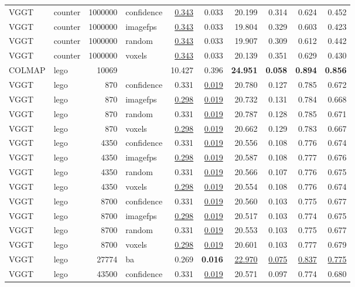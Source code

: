 \begin{table}[H]
\begin{tabular}{llrlrrrrrr}
VGGT & counter & 1000000 & confidence & \underline{0.343} & 0.033 & 20.199 & 0.314 & 0.624 & 0.452 \\
VGGT & counter & 1000000 & imagefps & \underline{0.343} & 0.033 & 19.804 & 0.329 & 0.603 & 0.423 \\
VGGT & counter & 1000000 & random & \underline{0.343} & 0.033 & 19.907 & 0.309 & 0.612 & 0.442 \\
VGGT & counter & 1000000 & voxels & \underline{0.343} & 0.033 & 20.139 & 0.351 & 0.629 & 0.430 \\
\midrule
COLMAP & lego & 10069 &  & 10.427 & 0.396 & \textbf{24.951} & \textbf{0.058} & \textbf{0.894} & \textbf{0.856} \\
VGGT & lego & 870 & confidence & 0.331 & \underline{0.019} & 20.780 & 0.127 & 0.785 & 0.672 \\
VGGT & lego & 870 & imagefps & \underline{0.298} & \underline{0.019} & 20.732 & 0.131 & 0.784 & 0.668 \\
VGGT & lego & 870 & random & 0.331 & \underline{0.019} & 20.787 & 0.128 & 0.785 & 0.671 \\
VGGT & lego & 870 & voxels & \underline{0.298} & \underline{0.019} & 20.662 & 0.129 & 0.783 & 0.667 \\
VGGT & lego & 4350 & confidence & 0.331 & \underline{0.019} & 20.556 & 0.108 & 0.776 & 0.674 \\
VGGT & lego & 4350 & imagefps & \underline{0.298} & \underline{0.019} & 20.587 & 0.108 & 0.777 & 0.676 \\
VGGT & lego & 4350 & random & 0.331 & \underline{0.019} & 20.566 & 0.107 & 0.776 & 0.675 \\
VGGT & lego & 4350 & voxels & \underline{0.298} & \underline{0.019} & 20.554 & 0.108 & 0.776 & 0.674 \\
VGGT & lego & 8700 & confidence & 0.331 & \underline{0.019} & 20.560 & 0.103 & 0.775 & 0.677 \\
VGGT & lego & 8700 & imagefps & \underline{0.298} & \underline{0.019} & 20.517 & 0.103 & 0.774 & 0.675 \\
VGGT & lego & 8700 & random & 0.331 & \underline{0.019} & 20.553 & 0.103 & 0.775 & 0.677 \\
VGGT & lego & 8700 & voxels & \underline{0.298} & \underline{0.019} & 20.601 & 0.103 & 0.777 & 0.679 \\
VGGT & lego & 27774 & ba & 0.269 & \textbf{0.016} & \underline{22.970} & \underline{0.075} & \underline{0.837} & \underline{0.775} \\
VGGT & lego & 43500 & confidence & 0.331 & \underline{0.019} & 20.571 & 0.097 & 0.774 & 0.680 \\

\end{tabular}
\end{table}
